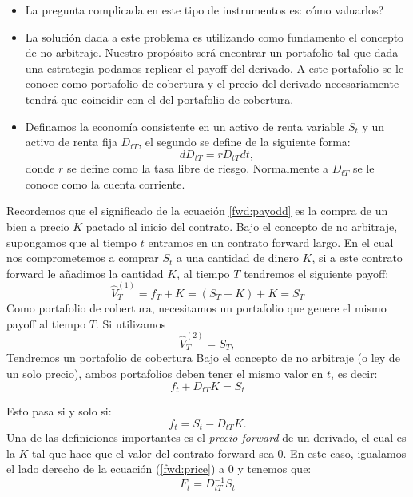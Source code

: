 \documentclass[11pt]{beamer}
\begin{document}
\begin{frame}{{}}
	\begin{itemize}
		\item La pregunta complicada en este tipo de instrumentos es: cómo valuarlos?
		\item La solución dada a este problema es utilizando como fundamento el concepto de no arbitraje. Nuestro propósito será encontrar un portafolio tal que dada una estrategia podamos replicar el payoff del derivado. A este portafolio se le conoce como portafolio de cobertura y el precio del derivado necesariamente tendrá que coincidir con el del portafolio de cobertura.
		\item Definamos la economía consistente en un activo de renta variable $S_t$ y un activo de renta fija $D_{tT}$, el segundo se define de la siguiente forma:
		\begin{equation}
		dD_{tT}=rD_{tT} dt,
		\end{equation}
		donde $r$ se define como la tasa libre de riesgo. Normalmente a $D_{tT}$ se le conoce como la cuenta corriente.
	\end{itemize}
	
\end{frame}

\begin{frame}{{}}
	Recordemos que el significado de la ecuación \ref{fwd:payodd} es la compra de un bien a precio $K$ pactado al inicio del contrato. Bajo el concepto de no arbitraje, supongamos que al tiempo $t$ entramos en un contrato forward largo. En el cual nos comprometemos a comprar $S_t$ a una cantidad  de dinero $K$, si a este contrato forward le añadimos la cantidad $K$, al  tiempo $T$ tendremos el siguiente payoff:
	\begin{equation}
	\widehat{V}_T^{(1)}=f_T+K=(S_T-K)+K=S_T
	\end{equation} 
	Como portafolio de cobertura, necesitamos un portafolio que genere el mismo payoff al tiempo $T$. Si utilizamos 
	\begin{equation}
	\widehat{V}_T^{(2)}=S_T,
	\end{equation}
	Tendremos un portafolio de cobertura Bajo el concepto de no arbitraje (o ley de un solo precio), ambos portafolios deben tener el mismo valor en $t$, es decir:
	\begin{equation}
	f_t+D_{tT} K=S_t
	\end{equation}
\end{frame}

\begin{frame}{{}}
	Esto pasa si y solo si:
	\begin{equation}\label{fwd:price}
	f_t=S_t-D_{tT}K.
	\end{equation}
	Una de las definiciones importantes es el \textit{precio forward} de un derivado, el cual es la $K$ tal que hace que el valor del contrato forward sea 0. En este caso, igualamos el lado derecho de la ecuación (\ref{fwd:price}) a 0 y tenemos que:
	\begin{equation}
	F_t=D_{tT}^{-1}S_t
	\end{equation}
	
	
\end{frame}
\end{document}

